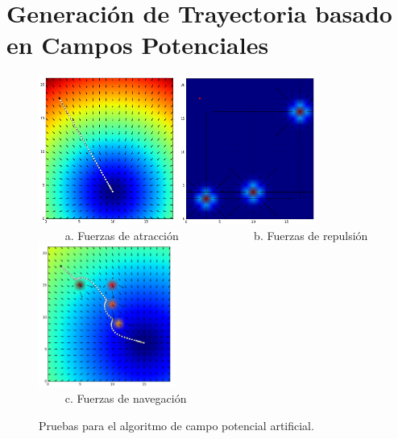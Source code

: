 \section{Generaci\'on de Trayectoria basado en Campos Potenciales}
\label{sec:autonomia}
\begin{figure}%
  \centering \footnotesize
  \includegraphics[width=0.40\textwidth]{images/attr_force.png}
  \includegraphics[width=0.40\textwidth]{images/rep_force.png}
  \\ $\qquad$ a. Fuerzas de atracción  $\qquad\qquad\qquad$  b. Fuerzas de repulsión
  \includegraphics[width=0.40\textwidth]{images/nav_force.png}
  \\ $\qquad$ c. Fuerzas de navegación
  \captionsetup{font=footnotesize}
  \caption{Pruebas para el algoritmo de campo potencial artificial.}
  \label{f:APF}
\end{figure}
